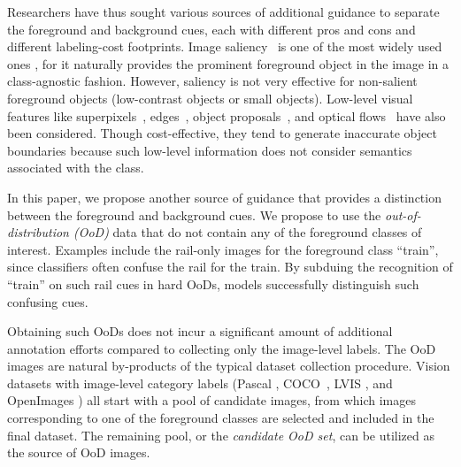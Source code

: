 \documentclass[10pt,twocolumn,letterpaper]{article}
\begin{document}
Researchers have thus sought various sources of additional guidance to separate the foreground and background cues, each with different pros and cons and different labeling-cost footprints. Image saliency~\cite{li2014secrets, liu2010learning} is one of the most widely used ones \cite{lee2019ficklenet, lee2021railroad, yao2021nonsalient, sun2020mining, liu2020leveraging, joon2017exploiting}, for it naturally provides the prominent foreground object in the image in a class-agnostic fashion. However, saliency is not very effective for non-salient foreground objects (\eg low-contrast objects or small objects). Low-level visual features like superpixels~\cite{kwak2017weakly, wang2018weakly}, edges~\cite{ke2021universal}, object proposals~\cite{lee2021bbam, song2019box, liu2020leveraging}, and optical flows~\cite{hong2017weakly, lee2019frame} have also been considered. 
Though cost-effective, they tend to generate inaccurate object boundaries because such low-level information does not consider semantics associated with the class.





In this paper, we propose another source of guidance that provides a distinction between the foreground and background cues. 
We propose to use the \textit{out-of-distribution (OoD)} data that do not contain any of the foreground classes of interest.
Examples include the rail-only images for the foreground class ``train'', since classifiers often confuse the rail for the train. 
By subduing the recognition of ``train'' on such rail cues in hard OoDs, models successfully distinguish such confusing cues.





Obtaining such OoDs does not incur a significant amount of additional annotation efforts compared to collecting only the image-level labels.
The OoD images are natural by-products of the typical dataset collection procedure. Vision datasets with image-level category labels (\eg Pascal \cite{everingham2010pascal}, COCO~\cite{lin2014microsoft}, LVIS \cite{gupta2019lvis}, and OpenImages \cite{kuznetsova2020open}) all start with a pool of candidate images, from which images corresponding to one of the foreground classes are selected and included in the final dataset. The remaining pool, or the \textit{candidate OoD set}, can be utilized as the source of OoD images. 
\end{document}
